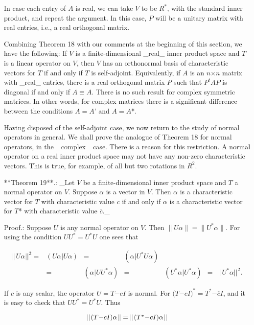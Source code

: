 In case each entry of \(A\) is real, we can take \(V\) to be \(R^{*}\), with the standard inner product, and repeat the argument. In this case, \(P\) will be a unitary matrix with real entries, i.e., a real orthogonal matrix.

Combining Theorem 18 with our comments at the beginning of this section, we have the following: If \(V\) is a finite-dimensional _real_ inner product space and \(T\) is a linear operator on \(V\), then \(V\) has an orthonormal basis of characteristic vectors for \(T\) if and only if \(T\) is self-adjoint. Equivalently, if \(A\) is an \(n\)\(\times\)\(n\) matrix with _real_ entries, there is a real orthogonal matrix \(P\) such that \(P^{t}AP\) is diagonal if and only if \(A\)\(\equiv\)\(A\). There is no such result for complex symmetric matrices. In other words, for complex matrices there is a significant difference between the conditions \(A\)\(=\)\(A\)' and \(A\)\(=\)\(A\)*.

Having disposed of the self-adjoint case, we now return to the study of normal operators in general. We shall prove the analogue of Theorem 18 for normal operators, in the _complex_ case. There is a reason for this restriction. A normal operator on a real inner product space may not have any non-zero characteristic vectors. This is true, for example, of all but two rotations in \(R^{2}\).

**Theorem 19**.: _Let \(V\) be a finite-dimensional inner product space and \(T\) a normal operator on \(V\). Suppose \(\alpha\) is a vector in \(V\). Then \(\alpha\) is a characteristic vector for \(T\) with characteristic value \(c\) if and only if \(\alpha\) is a characteristic vector for \(T\)* with characteristic value \(\overline{c}\)._

Proof.: Suppose \(U\) is any normal operator on \(V\). Then \(\|U\alpha\|=\)\(\|U^{*}\alpha\|\). For using the condition \(UU^{*}\)\(=\)\(U^{*}U\) one sees that

\[\begin{array}{rcl}||U\alpha||^{2}=&(U\alpha|U\alpha)&=&(\alpha|U^{*}U\alpha) \\ &=&(\alpha|UU^{*}\alpha)&=&(U^{*}\alpha|U^{*}\alpha)&=&||U^{*}\alpha||^{2}.\end{array}\]

If \(c\) is any scalar, the operator \(U\)\(=\)\(T\)\(-\)\(cI\) is normal. For \((T\)\(-\)\(cI)^{*}\)\(=\)\(T^{*}\)\(-\)\(\overline{c}I\), and it is easy to check that \(UU^{*}\)\(=\)\(U^{*}U\). Thus

\[||(T\)\(-\)\(cI)\alpha||=||(T^{*}\)\(-\)\(cI)\alpha||\]

